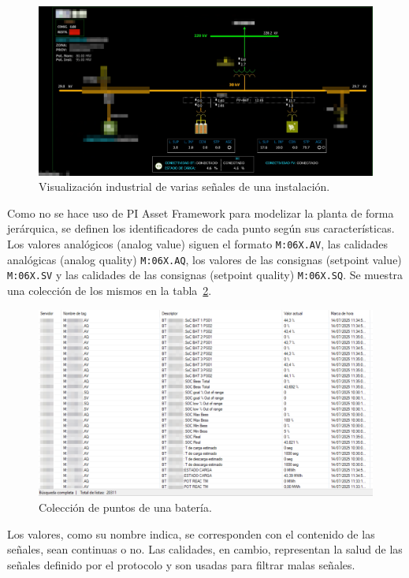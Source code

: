 \begin{figure}
  \centering
  \includegraphics[width=0.75\linewidth]{figures/visualizacion-industrial-de-bateria.png}
  \caption[Visualización industrial de señales de instalación.]{Visualización industrial de varias señales de una instalación.}
  \label{fig:visualizacion-industrial-de-bateria}
\end{figure}

Como no se hace uso de PI Asset Framework para modelizar la planta de forma jerárquica, se definen los identificadores de cada punto según sus características. Los valores analógicos (analog value) siguen el formato \texttt{M:06X.AV}, las calidades analógicas (analog quality) \texttt{M:06X.AQ}, los valores de las consignas (setpoint value) \texttt{M:06X.SV} y las calidades de las consignas (setpoint quality) \texttt{M:06X.SQ}. Se muestra una colección de los mismos en la tabla~\ref{fig:puntos-bateria}.

\begin{figure}
  \centering
  \includegraphics[width=0.75\linewidth]{figures/puntos-bateria.png}
  \caption[Colección de puntos de una batería.]{Colección de puntos de una batería.}
  \label{fig:puntos-bateria}
\end{figure}

Los valores, como su nombre indica, se corresponden con el contenido de las señales, sean continuas o no. Las calidades, en cambio, representan la salud de las señales definido por el protocolo y son usadas para filtrar malas señales.

